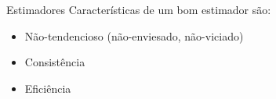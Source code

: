 \documentclass{beamer}
\begin{document}



\begin{frame}{Estimadores}
Características de um bom estimador são:
\begin{itemize}
\item Não-tendencioso (não-enviesado, não-viciado)
\item Consistência
\item Eficiência
\end{itemize}
\end{frame}
\end{document}
